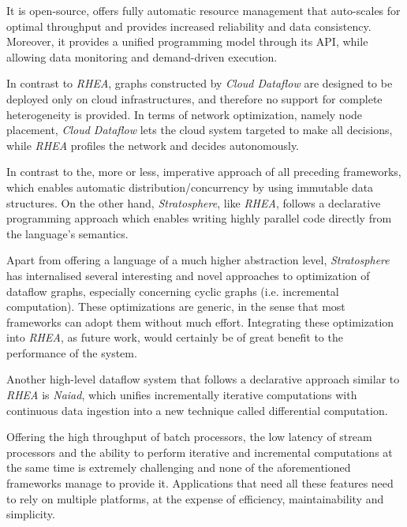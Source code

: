 \documentclass{dithesis}
\begin{document}
It is open-source, offers fully automatic resource management that auto-scales for optimal throughput and provides increased reliability and data consistency. Moreover, it provides a unified programming model through its API, while allowing data monitoring and demand-driven execution.

In contrast to \textit{RHEA}, graphs constructed by \textit{Cloud Dataflow} are designed to be deployed only on cloud infrastructures, and therefore no support for complete heterogeneity is provided. In terms of network optimization, namely node placement,  \textit{Cloud Dataflow} lets the cloud system targeted to make all decisions, while \textit{RHEA} profiles the network and decides autonomously. 


In contrast to the, more or less, imperative approach of all preceding frameworks, which enables automatic distribution/concurrency by using immutable data structures. On the other hand, \textit{Stratosphere}\cite{stratosphere}, like \textit{RHEA}, follows a declarative programming approach which enables writing highly parallel code directly from the language's semantics. 

Apart from offering a language of a much higher abstraction level, \textit{Stratosphere} has internalised several interesting and novel approaches to optimization of dataflow graphs, especially concerning cyclic graphs (i.e. incremental computation)\cite{spinning}. These optimizations are generic, in the sense that most frameworks can adopt them without much effort. Integrating these optimization into \textit{RHEA}, as future work, would certainly be of great benefit to the performance of the system.


Another high-level dataflow system that follows a declarative approach similar to \textit{RHEA} is \textit{Naiad}, which unifies incrementally iterative computations with continuous data ingestion into a new
technique called differential computation.

Offering the high throughput of batch processors, the low latency of stream processors and the ability to perform iterative and incremental computations at the same time is extremely challenging and none of the aforementioned frameworks manage to provide it. Applications that need all these features need to rely on multiple platforms, at the expense of efficiency, maintainability and simplicity.
\end{document}
